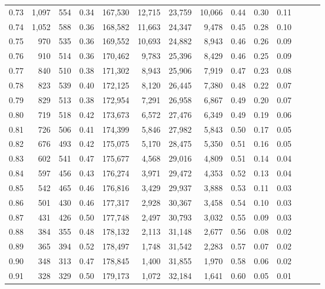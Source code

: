 \begin{tabular}{rrrrrrrrrrrrrr}
0.73 &  1,097 &  554 &  0.34 &  167,530 &   12,715 &  23,759 &  10,066 &  0.44 &  0.30 &      0.11 \\
0.74 &  1,052 &  588 &  0.36 &  168,582 &   11,663 &  24,347 &   9,478 &  0.45 &  0.28 &      0.10 \\
0.75 &    970 &  535 &  0.36 &  169,552 &   10,693 &  24,882 &   8,943 &  0.46 &  0.26 &      0.09 \\
0.76 &    910 &  514 &  0.36 &  170,462 &    9,783 &  25,396 &   8,429 &  0.46 &  0.25 &      0.09 \\
0.77 &    840 &  510 &  0.38 &  171,302 &    8,943 &  25,906 &   7,919 &  0.47 &  0.23 &      0.08 \\
0.78 &    823 &  539 &  0.40 &  172,125 &    8,120 &  26,445 &   7,380 &  0.48 &  0.22 &      0.07 \\
0.79 &    829 &  513 &  0.38 &  172,954 &    7,291 &  26,958 &   6,867 &  0.49 &  0.20 &      0.07 \\
0.80 &    719 &  518 &  0.42 &  173,673 &    6,572 &  27,476 &   6,349 &  0.49 &  0.19 &      0.06 \\
0.81 &    726 &  506 &  0.41 &  174,399 &    5,846 &  27,982 &   5,843 &  0.50 &  0.17 &      0.05 \\
0.82 &    676 &  493 &  0.42 &  175,075 &    5,170 &  28,475 &   5,350 &  0.51 &  0.16 &      0.05 \\
0.83 &    602 &  541 &  0.47 &  175,677 &    4,568 &  29,016 &   4,809 &  0.51 &  0.14 &      0.04 \\
0.84 &    597 &  456 &  0.43 &  176,274 &    3,971 &  29,472 &   4,353 &  0.52 &  0.13 &      0.04 \\
0.85 &    542 &  465 &  0.46 &  176,816 &    3,429 &  29,937 &   3,888 &  0.53 &  0.11 &      0.03 \\
0.86 &    501 &  430 &  0.46 &  177,317 &    2,928 &  30,367 &   3,458 &  0.54 &  0.10 &      0.03 \\
0.87 &    431 &  426 &  0.50 &  177,748 &    2,497 &  30,793 &   3,032 &  0.55 &  0.09 &      0.03 \\
0.88 &    384 &  355 &  0.48 &  178,132 &    2,113 &  31,148 &   2,677 &  0.56 &  0.08 &      0.02 \\
0.89 &    365 &  394 &  0.52 &  178,497 &    1,748 &  31,542 &   2,283 &  0.57 &  0.07 &      0.02 \\
0.90 &    348 &  313 &  0.47 &  178,845 &    1,400 &  31,855 &   1,970 &  0.58 &  0.06 &      0.02 \\
0.91 &    328 &  329 &  0.50 &  179,173 &    1,072 &  32,184 &   1,641 &  0.60 &  0.05 &      0.01 \\

\end{tabular}
